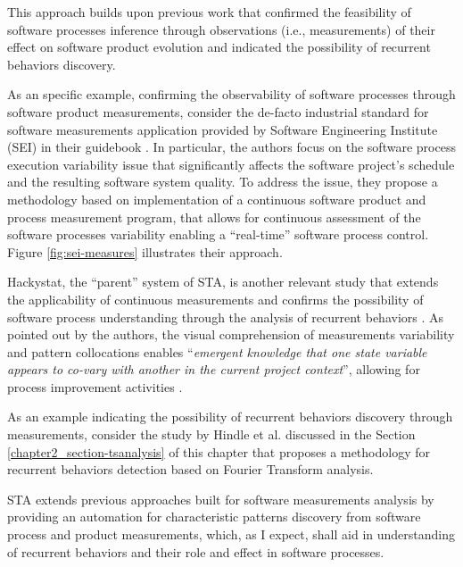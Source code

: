 This approach builds upon previous work that confirmed the feasibility of software processes inference through 
observations (i.e., measurements) of their effect on software product evolution and indicated the possibility of 
recurrent behaviors discovery. 

As an specific example, confirming the observability of software processes through software product measurements, 
consider the de-facto industrial standard for software measurements application provided by 
Software Engineering Institute (SEI) in their guidebook \cite{citeulike:10567306}. 
In particular, the authors focus on the software process execution variability issue that significantly 
affects the software project's schedule and the resulting software system quality. 
To address the issue, they propose a methodology based on implementation of a continuous software product 
and process measurement program, that allows for continuous assessment of the software processes 
variability enabling a ``real-time'' software process control. 
Figure \ref{fig:sei-measures} illustrates their approach.

Hackystat, the ``parent'' system of STA, is another relevant study that extends the applicability of continuous 
measurements and confirms the possibility of software process understanding through the analysis of recurrent 
behaviors \cite{citeulike:557296}. 
As pointed out by the authors, the visual comprehension of measurements variability and pattern collocations enables 
``\textit{emergent knowledge that one state variable appears to co-vary with another in the current project context}'',
allowing for process improvement activities \cite{citeulike:557296}. 

As an example indicating the possibility of recurrent behaviors discovery through measurements, consider the 
study by Hindle et al. \cite{citeulike:10377345} discussed in the Section \ref{chapter2_section-tsanalysis} of 
this chapter that proposes a methodology for recurrent behaviors detection based on Fourier Transform analysis.

STA extends previous approaches built for software measurements analysis by providing an automation for 
characteristic patterns discovery from software process and product measurements, which, as I expect, shall 
aid in understanding of recurrent behaviors and their role and effect in software processes.

